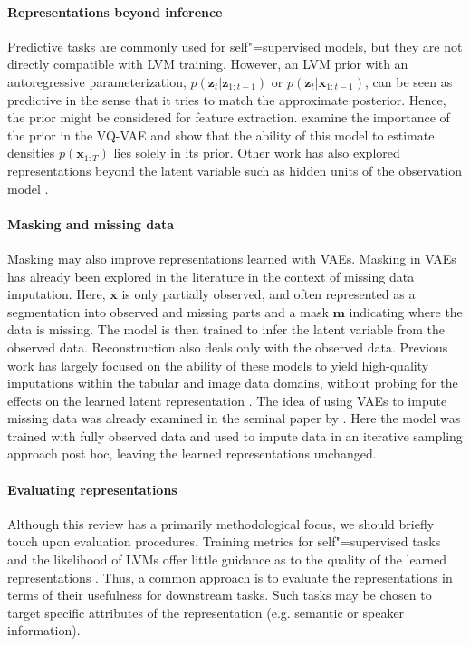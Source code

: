 {\paragraph{Representations beyond inference} 
Predictive tasks are commonly used for self"=supervised models, but they are not directly compatible with LVM training. 
However, an LVM prior with an autoregressive parameterization, $p(\mathbf{z}_t|\mathbf{z}_{1:t-1})$ or $p(\mathbf{z}_t|\mathbf{x}_{1:t-1})$, can be seen as predictive in the sense that it tries to match the approximate posterior.
Hence, the prior might be considered for feature extraction.
\textcite{jones_is_2020} examine the importance of the prior in the VQ-VAE and show that the ability of this model to estimate densities $p(\mathbf{x}_{1:T})$ lies solely in its prior. Other work has also explored representations beyond the latent variable such as hidden units of the observation model \parencite{khurana_convolutional_2020, chorowski_unsupervised_2019}.

\paragraph{Masking and missing data}
Masking may also improve representations learned with VAEs. 
Masking in VAEs has already been explored in the literature in the context of missing data imputation. Here, $\mathbf{x}$ is only partially observed, and often represented as a segmentation into observed and missing parts and a mask $\mathbf{m}$ indicating where the data is missing. The model is then trained to infer the latent variable from the observed data. Reconstruction also deals only with the observed data. Previous work has largely focused on the ability of these models to yield high-quality imputations within the tabular and image data domains, without probing for the effects on the learned latent representation \parencite{mattei_miwae_2019, ipsen_not-miwae_2021}. 
The idea of using VAEs to impute missing data was already examined in the seminal paper by \textcite{rezende_stochastic_2014}. Here the model was trained with fully observed data and used to impute data in an iterative sampling approach post hoc, leaving the learned representations unchanged.

\paragraph{Evaluating representations} 
Although this review has a primarily methodological focus, we should briefly touch upon evaluation procedures.
Training metrics for self"=supervised tasks and the likelihood of LVMs offer little guidance as to the quality of the learned representations \parencite{huszar_is_2017}. Thus, a common approach is to evaluate the representations in terms of their usefulness for downstream tasks. Such tasks may be chosen to target specific attributes of the representation (e.g. semantic or speaker information).

}
